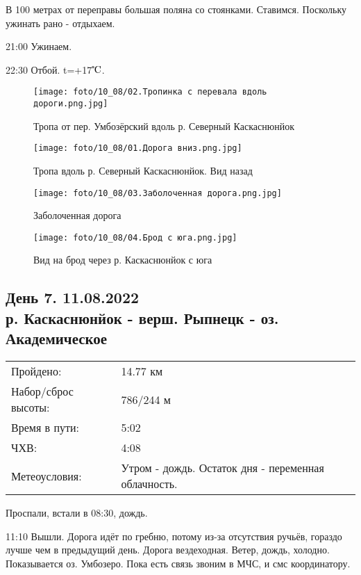 В 100 метрах от переправы большая поляна со стоянками. Ставимся. Поскольку ужинать рано - отдыхаем.

21:00 Ужинаем.

22:30 Отбой. t=+17$\tccentigrade$.

\begin{figure}
    \centering
    \texttt{[image: foto/10\_08/02.Тропинка с перевала вдоль дороги.png.jpg]}
    \caption{Тропа от пер. Умбозёрский вдоль р. Северный Каскаснюнйок}
\end{figure}

\begin{figure}
    \centering
    \texttt{[image: foto/10\_08/01.Дорога вниз.png.jpg]}
    \caption{Тропа вдоль р. Северный Каскаснюнйок. Вид назад}
\end{figure}

\begin{figure}
    \centering
    \texttt{[image: foto/10\_08/03.Заболоченная дорога.png.jpg]}
    \caption{Заболоченная дорога}
\end{figure}

\begin{figure}[H]
    \centering
    \texttt{[image: foto/10\_08/04.Брод с юга.png.jpg]}
    \caption{Вид на брод через р. Каскаснюнйок с юга}
\end{figure}

\subsection{День 7. 11.08.2022\\
 р. Каскаснюнйок - верш. Рыпнецк - оз. Академическое}
\begin{tabular}{l p{12cm}}
\hline
Пройдено: & 14.77 км\\
Набор/сброс высоты: & 786/244 м\\
Время в пути: & 5:02\\
ЧХВ: & 4:08\\
Метеоусловия: & Утром - дождь. Остаток дня - переменная облачность.\\
\hline
\end{tabular}

Проспали, встали в 08:30, дождь.

11:10 Вышли.
Дорога идёт по гребню, потому из-за отсутствия ручьёв, гораздо лучше чем в предыдущий день.
Дорога вездеходная. Ветер, дождь, холодно. Показывается оз. Умбозеро. Пока есть связь звоним в МЧС, и смс координатору.

